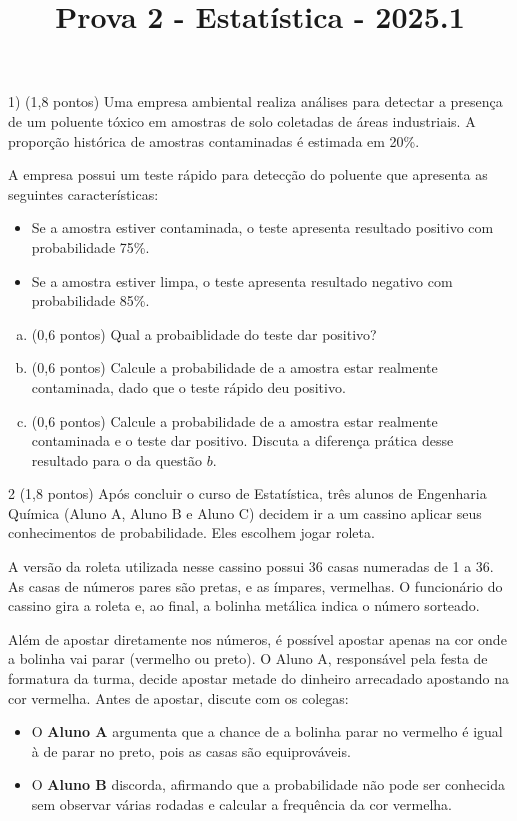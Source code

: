 \documentclass[12pt]{article}
\title{Prova 2 - Estatística - 2025.1}
\begin{document}
\date{}
\maketitle

1) (1,8 pontos) Uma empresa ambiental realiza análises para detectar a presença de um poluente tóxico em amostras de solo coletadas de áreas industriais. 
A proporção histórica de amostras contaminadas é estimada em 20\%.

A empresa possui um teste rápido para detecção do poluente que apresenta as seguintes características:

\begin{itemize}
    \item Se a amostra estiver contaminada, o teste apresenta resultado positivo com probabilidade 75\%.
    \item Se a amostra estiver limpa, o teste apresenta resultado negativo com probabilidade 85\%.
\end{itemize}

\begin{enumerate}[a)]
    \item (0,6 pontos) Qual a probaiblidade do teste dar positivo?
    \item (0,6 pontos) Calcule a probabilidade de a amostra estar realmente contaminada, dado que o teste rápido deu positivo.
    \item (0,6 pontos) Calcule a probabilidade de a amostra estar realmente contaminada e o teste dar positivo. Discuta a diferença prática desse resultado para o da questão $b$.
\end{enumerate}

2 (1,8 pontos) Após concluir o curso de Estatística, três alunos de Engenharia Química (Aluno A, Aluno B e Aluno C) decidem ir a um cassino aplicar seus conhecimentos de probabilidade. Eles escolhem jogar roleta.

A versão da roleta utilizada nesse cassino possui 36 casas numeradas de 1 a 36. As casas de números pares são pretas, e as ímpares, vermelhas. O funcionário do cassino gira a roleta e, ao final, a bolinha metálica indica o número sorteado.

Além de apostar diretamente nos números, é possível apostar apenas na cor onde a bolinha vai parar (vermelho ou preto). O Aluno A, responsável pela festa de formatura da turma, decide apostar metade do dinheiro arrecadado apostando na cor vermelha. Antes de apostar, discute com os colegas:

\begin{itemize}
    \item O \textbf{Aluno A} argumenta que a chance de a bolinha parar no vermelho é igual à de parar no preto, pois as casas são equiprováveis.
    \item O \textbf{Aluno B} discorda, afirmando que a probabilidade não pode ser conhecida sem observar várias rodadas e calcular a frequência da cor vermelha.
\end{itemize}
\end{document}
